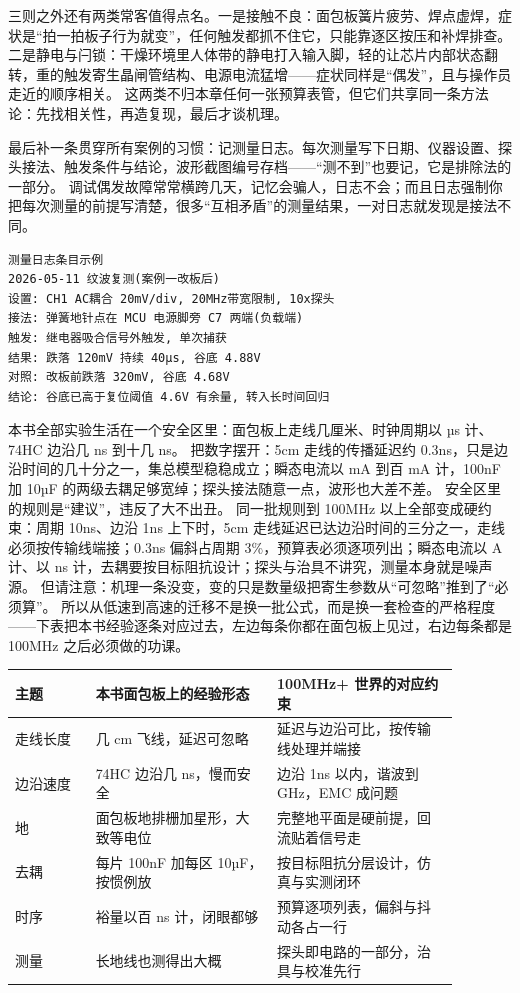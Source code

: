 三则之外还有两类常客值得点名。一是接触不良：面包板簧片疲劳、焊点虚焊，症状是“拍一拍板子行为就变”，任何触发都抓不住它，只能靠逐区按压和补焊排查。
二是静电与闩锁：干燥环境里人体带的静电打入输入脚，轻的让芯片内部状态翻转，重的触发寄生晶闸管结构、电源电流猛增——症状同样是“偶发”，且与操作员走近的顺序相关。
这两类不归本章任何一张预算表管，但它们共享同一条方法论：先找相关性，再造复现，最后才谈机理。

最后补一条贯穿所有案例的习惯：记测量日志。每次测量写下日期、仪器设置、探头接法、触发条件与结论，波形截图编号存档——“测不到”也要记，它是排除法的一部分。
调试偶发故障常常横跨几天，记忆会骗人，日志不会；而且日志强制你把每次测量的前提写清楚，很多“互相矛盾”的测量结果，一对日志就发现是接法不同。

\begin{lstlisting}
测量日志条目示例
2026-05-11 纹波复测(案例一改板后)
设置: CH1 AC耦合 20mV/div, 20MHz带宽限制, 10x探头
接法: 弹簧地针点在 MCU 电源脚旁 C7 两端(负载端)
触发: 继电器吸合信号外触发, 单次捕获
结果: 跌落 120mV 持续 40µs, 谷底 4.88V
对照: 改板前跌落 320mV, 谷底 4.68V
结论: 谷底已高于复位阈值 4.6V 有余量, 转入长时间回归
\end{lstlisting}

本书全部实验生活在一个安全区里：面包板上走线几厘米、时钟周期以 µs 计、74HC 边沿几 ns 到十几 ns。
把数字摆开：5cm 走线的传播延迟约 0.3ns，只是边沿时间的几十分之一，集总模型稳稳成立；瞬态电流以 mA 到百 mA 计，100nF 加 10µF 的两级去耦足够宽绰；探头接法随意一点，波形也大差不差。
安全区里的规则是“建议”，违反了大不出丑。
同一批规则到 100MHz 以上全部变成硬约束：周期 10ns、边沿 1ns 上下时，5cm 走线延迟已达边沿时间的三分之一，走线必须按传输线端接；0.3ns 偏斜占周期 3\%，预算表必须逐项列出；瞬态电流以 A 计、以 ns 计，去耦要按目标阻抗设计；探头与治具不讲究，测量本身就是噪声源。
但请注意：机理一条没变，变的只是数量级把寄生参数从“可忽略”推到了“必须算”。
所以从低速到高速的迁移不是换一批公式，而是换一套检查的严格程度——下表把本书经验逐条对应过去，左边每条你都在面包板上见过，右边每条都是 100MHz 之后必须做的功课。

\begin{longtable}{L{0.16\linewidth}L{0.36\linewidth}L{0.36\linewidth}}
\toprule
主题 & 本书面包板上的经验形态 & 100MHz+ 世界的对应约束 \\
\midrule
走线长度 & 几 cm 飞线，延迟可忽略 & 延迟与边沿可比，按传输线处理并端接 \\
边沿速度 & 74HC 边沿几 ns，慢而安全 & 边沿 1ns 以内，谐波到 GHz，EMC 成问题 \\
地 & 面包板地排栅加星形，大致等电位 & 完整地平面是硬前提，回流贴着信号走 \\
去耦 & 每片 100nF 加每区 10µF，按惯例放 & 按目标阻抗分层设计，仿真与实测闭环 \\
时序 & 裕量以百 ns 计，闭眼都够 & 预算逐项列表，偏斜与抖动各占一行 \\
测量 & 长地线也测得出大概 & 探头即电路的一部分，治具与校准先行 \\
\bottomrule
\end{longtable}


